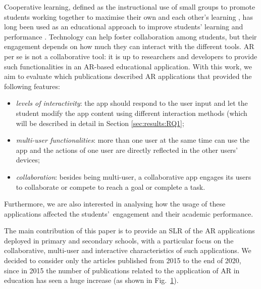 Cooperative learning, defined as the instructional use of small groups to promote students working together to maximise their own and each other's learning \cite{johnson1991cooperation}, has long been used as an educational approach to improve students' learning and performance \cite{johnson2008active, kuh2011piecing}. Technology can help foster collaboration among students, but their engagement depends on how much they can interact with the different tools. AR per se is not a collaborative tool: it is up to researchers and developers to provide such functionalities in an AR-based educational application. With this work, we aim to evaluate which publications described AR applications that provided the following features:
\begin{itemize}
    \item \emph{levels of interactivity}: the app should respond to the user input and let the student modify the app content using different interaction methods (which will be described in detail in Section \ref{sec:results:RQ1};
    \item \emph{multi-user functionalities}: more than one user at the same time can use the app and the actions of one user are directly reflected in the other users' devices;
    \item \emph{collaboration}: besides being multi-user, a collaborative app engages its users to collaborate or compete to reach a goal or complete a task.
\end{itemize}
Furthermore, we are also interested in analysing how the usage of these applications affected the students'\ engagement and their academic performance. 

\begin{figure}[htbp]
	\begin{center}
	
	\captionsetup{font=small}
	\caption{\fontsize{10pt}{11pt}}
	\label{fig:pappublbg}
    \end{center}
\end{figure}

The main contribution of this paper is to provide an \gls{SLR} of the \gls{AR} applications deployed in primary and secondary schools, with a particular focus on the collaborative, multi-user and interactive characteristics of such applications. We decided to consider only the articles published from 2015 to the end of 2020, since in 2015 the number of publications related to the application of \gls{AR} in education has seen a huge increase (as shown in Fig.~\ref{fig:pappublbg}).

